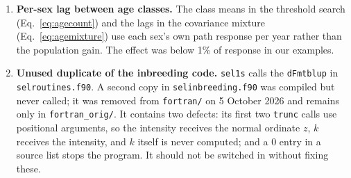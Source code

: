 \documentclass[11pt]{article}
\newcommand{\src}[1]{\texttt{#1}}
\begin{document}
\begin{enumerate}
\item \textbf{Per-sex lag between age classes.} The class means in the threshold search (Eq.~\eqref{eq:agecount}) and the lags in the covariance mixture (Eq.~\eqref{eq:agemixture}) use each sex's own path response per year rather than the population gain. The effect was below 1\% of response in our examples.
\item \textbf{Unused duplicate of the inbreeding code.} \src{sel1s} calls the \src{dFmtblup} in \src{selroutines.f90}. A second copy in \src{selinbreeding.f90} was compiled but never called; it was removed from \src{fortran/} on 5 October 2026 and remains only in \src{fortran\_orig/}. It contains two defects: its first two \src{trunc} calls use positional arguments, so the intensity receives the normal ordinate $z$, $k$ receives the intensity, and $k$ itself is never computed; and a 0 entry in a source list stops the program. It should not be switched in without fixing these.
\end{enumerate}
\end{document}
